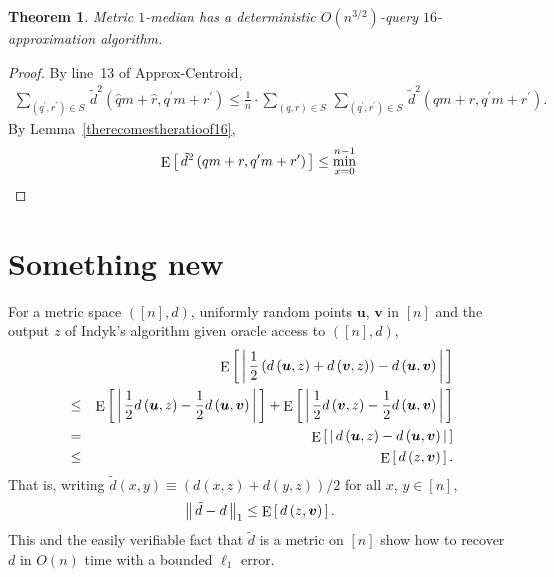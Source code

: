 \documentclass[letterpaper,12pt]{article}
\newtheorem{theorem}{Theorem}
\newcommand{\comment}[1]{}
\newcommand\bs[1]{\boldsymbol{#1}}
\begin{document}
{{\begin{theorem}
{\sc Metric $1$-median} has a deterministic $O(n^{3/2})$-query
$16$-approximation algorithm.
\end{theorem}
\begin{proof}
By line~13 of {\sf Approx-Centroid},
\begin{eqnarray*}
\sum_{(q^\prime,r^\prime)\in
S}\,{\tilde{d}}^2\left(\hat{q}m+\hat{r},q^\prime m+r^\prime\right)
\le \frac{1}{n}\cdot \sum_{(q,r)\in S}\,\sum_{(q^\prime,r^\prime)\in S}\,
{\tilde{d}}^2\left(qm+r,q^\prime m+r^\prime\right).
\end{eqnarray*}
\comment{Equivalently,
\begin{eqnarray*}
\mathop{\rm E}\left[\,{\tilde{d}}^2\left(\hat{q}m+\hat{r},q^\prime
m+r^\prime\right)\,\right]
\le
\mathop{\rm E}\left[\,{\tilde{d}}^2\left(qm+r,q^\prime
m+r^\prime\right)\,\right].
\end{eqnarray*}
}By Lemma~\ref{therecomestheratioof16},
\begin{eqnarray*}
\mathop{\rm E}\left[\,{\tilde{d}}^2\left(qm+r,q^\prime m+r^\prime\right)\,\right]
\le \min_{x=0}^{n-1}\,
\end{eqnarray*}
\end{proof}

\section{Something new}

For
a metric space
$([n],d)$,
uniformly random points
$\bs{u}$, $\bs{v}$
in $[n]$ and
the output $z$ of
Indyk's algorithm given oracle access to $([n],d)$,
\begin{eqnarray*}
&&\mathop{\rm
E}\left[\,\left|\,\frac{1}{2}\left(d\left(\bs{u},z\right)+d\left(\bs{v},z\right)\right)-d\left(\bs{u},\bs{v}\right)\,\right|\,\right]\\
&\le&
\mathop{\rm
E}\left[\,\left|\,\frac{1}{2}d\left(\bs{u},z\right)-\frac{1}{2}d\left(\bs{u},\bs{v}\right)\,\right|\,\right]
+\mathop{\rm
E}\left[\,\left|\,\frac{1}{2}d\left(\bs{v},z\right)-\frac{1}{2}d\left(\bs{u},\bs{v}\right)\,\right|\,\right]\\
&=&
\mathop{\rm
E}\left[\,\left|\,d\left(\bs{u},z\right)-d\left(\bs{u},\bs{v}\right)\,\right|\,\right]\\
&\le&\mathop{\rm E}\left[\,d\left(z,\bs{v}\right)\,\right].
\end{eqnarray*}
That is,
writing
$\tilde{d}(x,y)\equiv (d(x,z)+d(y,z))/2$ for all $x$, $y\in[n]$,
$$\left\|\,\tilde{d}-d\,\right\|_1
\le \mathop{\rm E}\left[\,d\left(z,\bs{v}\right)\,\right].$$
This and the easily verifiable fact that $\tilde{d}$ is a metric on $[n]$
show how to recover $d$ in $O(n)$ time with a bounded $\ell_1$ error.
}}



\noindent
\end{document}
